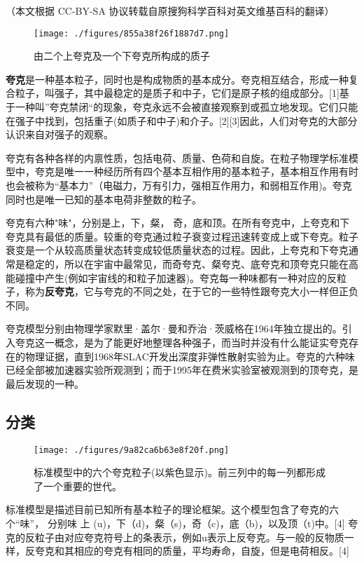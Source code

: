 
（本文根据 CC-BY-SA 协议转载自原搜狗科学百科对英文维基百科的翻译）

\begin{figure}[ht]
\centering
\texttt{[image: ./figures/855a38f26f1887d7.png]}
\caption{由二个上夸克及一个下夸克所构成的质子} \label{fig_Quark_13}
\end{figure}

\textbf{夸克}是一种基本粒子，同时也是构成物质的基本成分。夸克相互结合，形成一种复合粒子，叫强子，其中最稳定的是质子和中子，它们是原子核的组成部分。[1]基于一种叫”夸克禁闭“的现象，夸克永远不会被直接观察到或孤立地发现。它们只能在强子中找到，包括重子(如质子和中子)和介子。[2][3]因此，人们对夸克的大部分认识来自对强子的观察。

夸克有各种各样的内禀性质，包括电荷、质量、色荷和自旋。在粒子物理学标准模型中，夸克是唯一一种经历所有四个基本互相作用的基本粒子，基本相互作用有时也会被称为“基本力”（电磁力，万有引力，强相互作用力，和弱相互作用)。夸克同时也是唯一已知的基本电荷非整数的粒子。

夸克有六种"味"，分别是上，下，粲， 奇，底和顶。在所有夸克中，上夸克和下夸克具有最低的质量。较重的夸克通过粒子衰变过程迅速转变成上或下夸克。粒子衰变是一个从较高质量状态转变成较低质量状态的过程。因此，上夸克和下夸克通常是稳定的，所以在宇宙中最常见，而奇夸克、粲夸克、底夸克和顶夸克只能在高能碰撞中产生(例如宇宙线的和粒子加速器)。夸克每一种味都有一种对应的反粒子，称为\textbf{反夸克}，它与夸克的不同之处，在于它的一些特性跟夸克大小一样但正负不同。

夸克模型分别由物理学家默里·盖尔·曼和乔治·茨威格在1964年独立提出的。引入夸克这一概念，是为了能更好地整理各种强子，而当时并没有什么能证实夸克存在的物理证据，直到1968年SLAC开发出深度非弹性散射实验为止。夸克的六种味已经全部被加速器实验所观测到；而于1995年在费米实验室被观测到的顶夸克，是最后发现的一种。

\subsection{分类}
\begin{figure}[ht]
\centering
\texttt{[image: ./figures/9a82ca6b63e8f20f.png]}
\caption{标准模型中的六个夸克粒子(以紫色显示)。前三列中的每一列都形成了一个重要的世代。} \label{fig_Quark_1}
\end{figure}

标准模型是描述目前已知所有基本粒子的理论框架。这个模型包含了夸克的六个“味”， 分别味 上 (u)，下（d)，粲（s)，奇（c)，底（b)，以及顶（t)中。[4] 夸克的反粒子由对应夸克符号上的条表示，例如u表示上反夸克。与一般的反物质一样，反夸克和其相应的夸克有相同的质量，平均寿命，自旋，但是电荷相反。[4]

